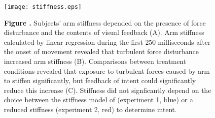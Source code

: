 \documentclass{frontiersSCNS} %
\begin{document}
\begin{figure}[h!]
\begin{center}
\texttt{[image: stiffness.eps]}
\end{center}
\textbf{\label{fig:03} Figure .}{ Subjects' arm stiffness depended on the presence of force disturbance and the contents of visual feedback (A). Arm stiffness calculated by linear regression during the first 250 milliseconds after the onset of movement revealed that turbulent force disturbance increased arm stiffness (B). Comparisons between treatment conditions revealed that exposure to turbulent forces caused by arm to stiffen significantly, but feedback of intent could significantly reduce this increase (C). Stiffness did not signficantly depend on the choice between the stiffness model of \cite{shadmehr1994adaptive} (experiment 1, blue) or a reduced stiffness (experiment 2, red) to determine intent.}
\end{figure}



\end{document}
